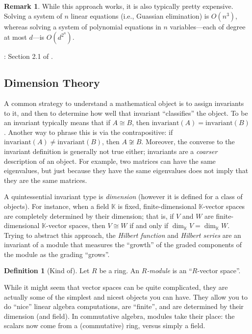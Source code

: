 \documentclass[12pt,a4paper]{article}
\newcommand{\KK}{\mathbb{K}}
\theoremstyle{definition}
\newtheorem{definition}[theorem]{Definition}
\newtheorem{remark}[theorem]{Remark}
\numberwithin{equation}{section}
\begin{document}
\begin{remark}
    While this approach works, it is also typically pretty expensive.
    Solving a system of $n$ linear equations (i.e., Guassian elimination) is $O(n^3)$, whereas solving a system of polynomial equations in $n$ variables---each of degree at most $d$---is $O(d^{2^n})$.
\end{remark}

\vspace*{1cm}

: Section 2.1 of \cite{schenck_computational_2003}.

\vspace*{1cm}


\subsection{Dimension Theory}
A common strategy to understand a mathematical object is to assign invariants to it, and then to determine how well that invariant ``classifies'' the object.
To be an invariant typically means that if $A \cong B$, then $\text{invariant}(A) = \text{invariant}(B)$.
Another way to phrase this is via the contrapositive: if $\text{invariant}(A) \neq \text{invariant}(B)$, then $A \not\cong B$.
Moreover, the converse to the invariant definition is generally not true either; invariants are a \emph{coarser} description of an object.
For example, two matrices can have the same eigenvalues, but just because they have the same eigenvalues does not imply that they are the same matrices.

A quintessential invariant type is \emph{dimension} (however it is defined for a class of objects).
For instance, when a field $\KK$ is fixed, finite-dimensional $\KK$-vector spaces are completely determined by their dimension; that is, if $V$ and $W$ are finite-dimensional $\KK$-vector spaces, then $V \cong W$ if and only if $\dim_{\KK}{V} = \dim_{\KK}{W}$.
Trying to abstract this approach, the \emph{Hilbert function} and \emph{Hilbert series} are an invariant of a module that measures the ``growth'' of the graded components of the module as the grading ``grows''.

\begin{definition}[Kind of]
    Let $R$ be a ring.
    An \emph{$R$-module} is an ``$R$-vector space''.
\end{definition}

While it might seem that vector spaces can be quite complicated, they are actually some of the simplest and nicest objects you can have.
They allow you to do ``nice'' linear algebra computations, are ``finite'', and are determined by their dimension (and field).
In commutative algebra, modules take their place: the scalars now come from a (commutative) ring, versus simply a field.
\end{document}
